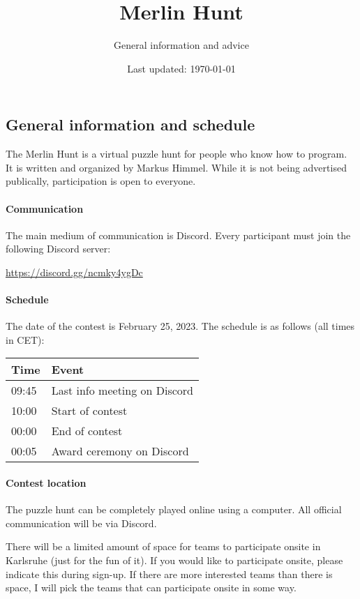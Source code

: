 \documentclass[fontsize=10pt,a4paper,DIV=12,parskip=half]{scrarticle}
\title{Merlin Hunt}
\subtitle{General information and advice}
\date{Last updated: \today}
\begin{document}
\maketitle

\subsection*{General information and schedule}

The Merlin Hunt is a virtual puzzle hunt for people who know how to program.
It is written and organized by Markus Himmel. While it is not being advertised
publically, participation is open to everyone.

\paragraph{Communication} The main medium of communication is Discord. Every participant must join the following
Discord server:

\begin{center}
	\url{https://discord.gg/ncmky4ygDc}
\end{center}

\paragraph{Schedule}
The date of the contest is February 25, 2023. The schedule is as follows (all times in CET):

\begin{center}
	\begin{tabular}{@{}ll@{}}
		\toprule
		Time & Event \\ \midrule
		09:45 & Last info meeting on Discord \\
		10:00 & Start of contest \\
		00:00 & End of contest \\
		00:05 & Award ceremony on Discord \\ \bottomrule
	\end{tabular}
\end{center}

\paragraph{Contest location}
The puzzle hunt can be completely played online using a computer. All official
communication will be via Discord.

There will be a limited amount of space for teams to participate onsite in Karlsruhe (just for the fun of it).
If you would like to participate onsite, please indicate this during sign-up. If
there are more interested teams than there is space, I will pick the teams that
can participate onsite in some way.
\end{document}
